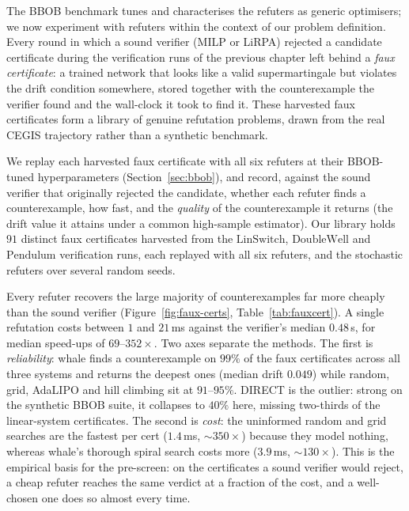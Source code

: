 The BBOB benchmark tunes and characterises the refuters as generic optimisers;
we now experiment with refuters within the context of our problem definition. Every round in
which a sound verifier (MILP or LiRPA) rejected a candidate certificate during
the verification runs of the previous chapter left behind a \emph{faux certificate}: a
trained network that looks like a valid supermartingale but violates the drift
condition somewhere, stored together with the counterexample the verifier found
and the wall-clock it took to find it. These harvested faux certificates form a
library of genuine refutation problems, drawn from the real CEGIS trajectory
rather than a synthetic benchmark.

We replay each harvested faux certificate with all six refuters at their
BBOB-tuned hyperparameters (Section~\ref{sec:bbob}), and record, against the
sound verifier that originally rejected the candidate, whether each refuter finds
a counterexample, how fast, and the \emph{quality} of the counterexample it
returns (the drift value it attains under a common high-sample estimator). Our
library holds $91$ distinct faux certificates harvested from the $\mathrm{LinSwitch}$,
$\mathrm{DoubleWell}$ and $\mathrm{Pendulum}$ verification runs, each replayed with all
six refuters, and the stochastic refuters over several random seeds.

Every refuter recovers the large majority of counterexamples far more cheaply
than the sound verifier (Figure~\ref{fig:faux-certs}, Table~\ref{tab:fauxcert}).
A single refutation costs between $1$ and $21$\,ms against the verifier's median
$0.48$\,s, for median speed-ups of $69$--$352\times$. Two axes separate the
methods. The first is \emph{reliability}: whale finds a counterexample on $99\%$
of the faux certificates across all three systems and returns the deepest ones
(median drift $0.049$)
while random, grid, AdaLIPO and hill climbing sit at $91$--$95\%$. DIRECT is the
outlier: strong on the synthetic BBOB suite, it collapses to $40\%$ here, missing
two-thirds of the linear-system certificates. The second is \emph{cost}:
the uninformed random and grid searches are the fastest per cert ($1.4$\,ms,
${\sim}350\times$) because they model nothing, whereas whale's thorough spiral
search costs more ($3.9$\,ms, ${\sim}130\times$). This is the empirical basis for the pre-screen: on the
certificates a sound verifier would reject, a cheap refuter reaches the same
verdict at a fraction of the cost, and a well-chosen one does so almost every
time.


